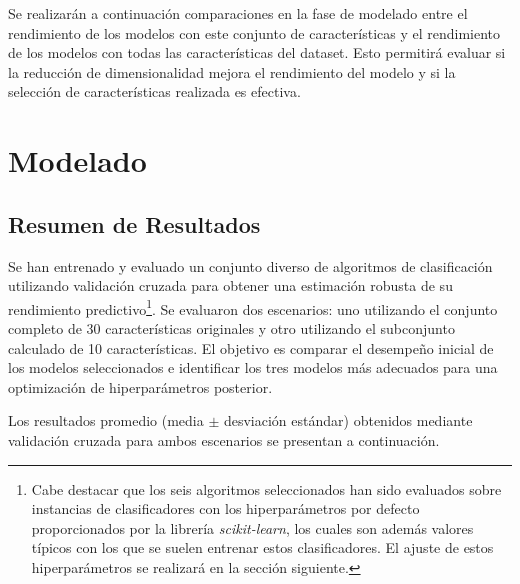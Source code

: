 \documentclass[a4paper,12pt]{article}
\begin{document}
Se realizarán a continuación comparaciones en la fase de modelado entre el rendimiento de los modelos con este conjunto de características y el rendimiento de los modelos con todas las características del dataset. Esto permitirá evaluar si la reducción de dimensionalidad mejora el rendimiento del modelo y si la selección de características realizada es efectiva.


\newpage
\section{Modelado}

\subsection{Resumen de Resultados}

Se han entrenado y evaluado un conjunto diverso de algoritmos de clasificación utilizando validación cruzada para obtener una estimación robusta de su rendimiento predictivo\footnote{Cabe destacar que los seis algoritmos seleccionados han sido evaluados sobre instancias de clasificadores con los hiperparámetros por defecto proporcionados por la librería \textit{scikit-learn}, los cuales son además valores típicos con los que se suelen entrenar estos clasificadores. El ajuste de estos hiperparámetros se realizará en la sección siguiente.}. Se evaluaron dos escenarios: uno utilizando el conjunto completo de 30 características originales y otro utilizando el subconjunto calculado de 10 características. El objetivo es comparar el desempeño inicial de los modelos seleccionados e identificar los tres modelos más adecuados para una optimización de hiperparámetros posterior.

Los resultados promedio (media $\pm$ desviación estándar) obtenidos mediante validación cruzada para ambos escenarios se presentan a continuación.
\end{document}
